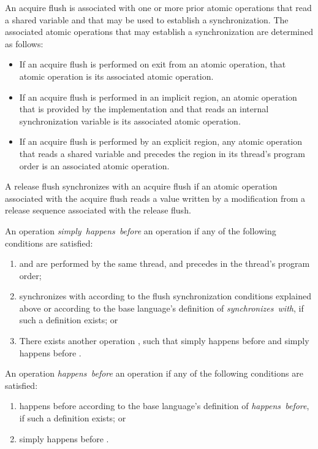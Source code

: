 An acquire flush is associated with one or more prior atomic operations that
read a shared variable and that may be used to establish a synchronization.
The associated atomic operations that may establish a synchronization are
determined as follows:

\begin{itemize}
\item If an acquire flush is performed on exit from an atomic operation, that
    atomic operation is its associated atomic operation.
\item If an acquire flush is performed in an implicit  region, an  
    atomic operation that is provided by the implementation and that reads an 
    internal synchronization variable is its associated atomic operation.
\item If an acquire flush is performed by an explicit  region, any
    atomic operation that reads a shared variable and precedes the
     region in its thread's program order is an associated atomic
    operation.
\end{itemize}

A release flush synchronizes with an acquire flush if an atomic operation
associated with the acquire flush reads a value written by a modification from
a release sequence associated with the release flush.

An operation  \emph{simply~happens~before} an operation  
if any of the following conditions are satisfied:
\begin{enumerate}
\item {} and  are performed by the same thread, and  
      precedes  in the thread's program order;
\item {} synchronizes with  according to the flush 
      synchronization conditions explained above or according
      to the base language's definition of \emph{synchronizes~with}, 
      if such a definition exists; or
\item There exists another operation , such that  simply 
      happens before  and  simply happens before .
\end{enumerate}

An operation  \emph{happens~before} an operation  
if any of the following conditions are satisfied:
\begin{enumerate}
\item {} happens before  according to the base language's 
      definition of \emph{happens~before}, if such a definition exists; or
\item {} simply happens before .
\end{enumerate}

